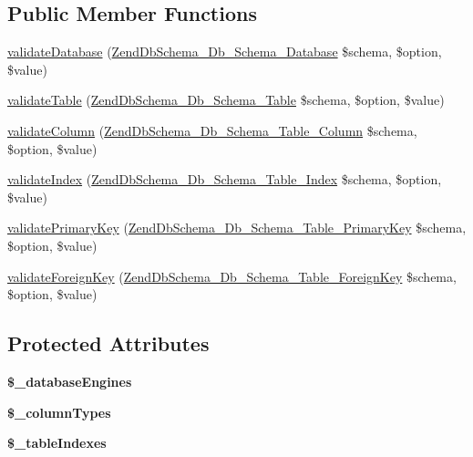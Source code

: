 \subsection*{\-Public \-Member \-Functions}
\begin{DoxyCompactItemize}
\item 
\hyperlink{classZendDbSchema__Db__Schema__Validator__Mysql_ab77a7fe20e34115d4b2679521b8918c0}{validate\-Database} (\hyperlink{classZendDbSchema__Db__Schema__Database}{\-Zend\-Db\-Schema\-\_\-\-Db\-\_\-\-Schema\-\_\-\-Database} \$schema, \$option, \$value)
\item 
\hyperlink{classZendDbSchema__Db__Schema__Validator__Mysql_a0c68fa05f88c3a6f603b04709133ef68}{validate\-Table} (\hyperlink{classZendDbSchema__Db__Schema__Table}{\-Zend\-Db\-Schema\-\_\-\-Db\-\_\-\-Schema\-\_\-\-Table} \$schema, \$option, \$value)
\item 
\hyperlink{classZendDbSchema__Db__Schema__Validator__Mysql_a8dbce664f413a35abaf836233b4cc054}{validate\-Column} (\hyperlink{classZendDbSchema__Db__Schema__Table__Column}{\-Zend\-Db\-Schema\-\_\-\-Db\-\_\-\-Schema\-\_\-\-Table\-\_\-\-Column} \$schema, \$option, \$value)
\item 
\hyperlink{classZendDbSchema__Db__Schema__Validator__Mysql_a0cf7ff88ff35c9636c0bb80f08416cb3}{validate\-Index} (\hyperlink{classZendDbSchema__Db__Schema__Table__Index}{\-Zend\-Db\-Schema\-\_\-\-Db\-\_\-\-Schema\-\_\-\-Table\-\_\-\-Index} \$schema, \$option, \$value)
\item 
\hyperlink{classZendDbSchema__Db__Schema__Validator__Mysql_a68e9ec20adec3be1ac1494fb666f2acd}{validate\-Primary\-Key} (\hyperlink{classZendDbSchema__Db__Schema__Table__PrimaryKey}{\-Zend\-Db\-Schema\-\_\-\-Db\-\_\-\-Schema\-\_\-\-Table\-\_\-\-Primary\-Key} \$schema, \$option, \$value)
\item 
\hyperlink{classZendDbSchema__Db__Schema__Validator__Mysql_a2c7ec868701fb965d57551639b637955}{validate\-Foreign\-Key} (\hyperlink{classZendDbSchema__Db__Schema__Table__ForeignKey}{\-Zend\-Db\-Schema\-\_\-\-Db\-\_\-\-Schema\-\_\-\-Table\-\_\-\-Foreign\-Key} \$schema, \$option, \$value)
\end{DoxyCompactItemize}
\subsection*{\-Protected \-Attributes}
\begin{DoxyCompactItemize}
\item 
{\bfseries \$\-\_\-database\-Engines}
\item 
\hypertarget{classZendDbSchema__Db__Schema__Validator__Mysql_a6912c20245830030a5b66e4eb9dd0fff}{{\bfseries \$\-\_\-column\-Types}}\label{classZendDbSchema__Db__Schema__Validator__Mysql_a6912c20245830030a5b66e4eb9dd0fff}

\item 
{\bfseries \$\-\_\-table\-Indexes}
\end{DoxyCompactItemize}


